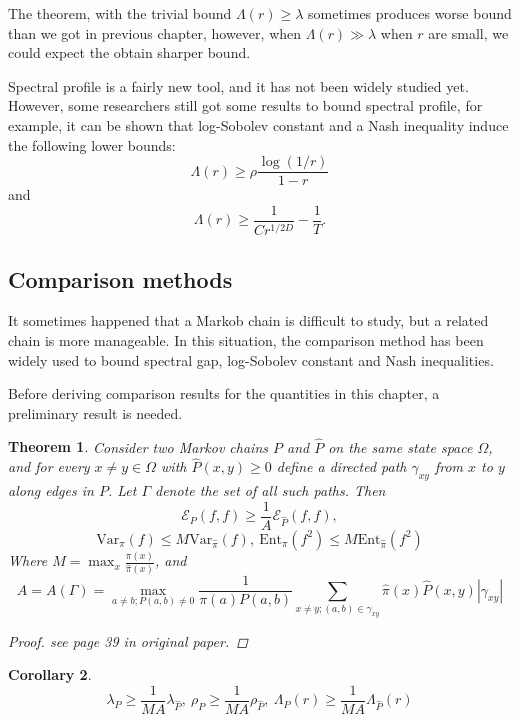 \documentclass[12pt,reqno]{amsart}
\newtheorem{thm}{Theorem}[section]
\newtheorem{cor}[thm]{Corollary}
\begin{document}
The theorem, with the trivial bound $\Lambda(r)\geq \lambda$ sometimes produces worse bound than we got in previous chapter, however, when $\Lambda(r) \gg \lambda$ when $r$ are small, we could expect the obtain sharper bound.

Spectral profile is a fairly new tool, and it has not been widely studied yet. However, some researchers still got some results to bound spectral profile, for example, it can be shown that log-Sobolev constant and a Nash inequality induce the following lower bounds:
$$
\Lambda(r) \geq \rho \frac{\log(1/r)}{1-r}
$$
and 
$$
\Lambda(r) \geq \frac{1}{Cr^{1/2D}} - \frac{1}{T}.
$$

\subsection{Comparison methods}
It sometimes happened that a Markob chain is difficult to study, but a related chain is more manageable. In this situation, the comparison method has been widely used to bound spectral gap, log-Sobolev constant and Nash inequalities.

Before deriving comparison results for the quantities in this chapter, a preliminary result is needed.

\begin{thm}
  Consider two Markov chains $P$ and $\hat{P}$ on the same state space $\Omega$, and for every $x\neq y \in \Omega$ with $\hat{P}(x,y)\geq 0$ define a directed path $\gamma_{xy}$ from $x$ to $y$ along edges in $P$. Let $\Gamma$ denote the set of all such paths. Then
  \begin{equation}
    \label{eq:2.14}
    \mathcal{E}_P(f,f)\geq \frac{1}{A}\mathcal{E}_{\hat{P}}(f,f),
  \end{equation}
  \begin{equation}
    \mbox{Var}_{\pi}(f)\leq M \mbox{Var}_{\hat{\pi}}(f),~
    \mbox{Ent}_{\pi}(f^2)\leq M \mbox{Ent}_{\hat{\pi}}(f^2)
  \end{equation}
Where $M=\max_x\frac{\pi(x)}{\hat{\pi}(x)}$, and
$$
A = A(\Gamma) = \max_{a \neq b;P(a,b)\neq 0}\frac{1}{\pi(a)P(a,b)}\sum_{x\neq y;(a,b)\in \gamma_{xy}}
\hat{\pi}(x)\hat{P}(x,y)|\gamma_{xy}|
$$
\begin{proof}
  see page 39 in original paper.
\end{proof}
\end{thm}

\begin{cor}
$$  
\lambda_P\geq \frac{1}{MA}\lambda_{\hat{P}},~\rho_P\geq \frac{1}{MA}\rho_{\hat{P}},~ \Lambda_P(r)\geq \frac{1}{MA}\Lambda_{\hat{P}}(r) 
$$
\end{cor}
\end{document}
